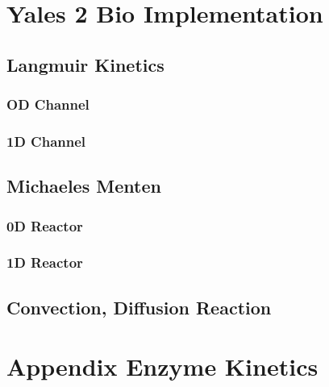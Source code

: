 \documentclass[%
 nofootinbib,
 amsmath,amssymb,
 aps,
 pra,
]{revtex4-1}
\begin{document}
\section{Yales 2 Bio Implementation}
\subsection{Langmuir Kinetics}
\subsubsection{OD Channel}
\subsubsection{1D Channel}
\subsection{Michaeles Menten}
\subsubsection{0D Reactor}
\subsubsection{1D Reactor}
\subsection{Convection, Diffusion Reaction}

\section{Appendix Enzyme Kinetics}
\end{document}
